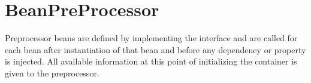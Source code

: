 \section{BeanPreProcessor}
\label{feature:BeanPreProcessor}
\ClearAPI
Preprocessor beans are defined by implementing the interface  and are called for each bean after instantiation of that bean and before any dependency or property is injected. All available information at this point of initializing the container is given to the preprocessor.

